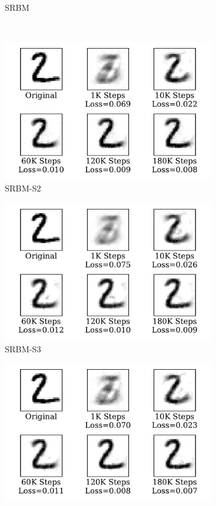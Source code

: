 \begin{figure}
\begin{subfigure}[t]{0.32\textwidth}
		\caption{SRBM}
	\end{subfigure}\\
	\begin{subfigure}[t]{0.32\textwidth}
		\includegraphics[width=\textwidth]{pics_sdlm/52_MNIST_SRBM_noise/recon_digit.pdf}
		\caption{SRBM-S2}
	\end{subfigure}
	\begin{subfigure}[t]{0.32\textwidth}
		\includegraphics[width=\textwidth]{pics_sdlm/51_MNIST_SRBM_teach/recon_digit.pdf}
		\caption{SRBM-S3}
	\end{subfigure}
	\begin{subfigure}[t]{0.32\textwidth}
		\includegraphics[width=\textwidth]{pics_sdlm/53_MNIST_SRBM_all/recon_digit.pdf}

\end{subfigure}
\end{figure}
